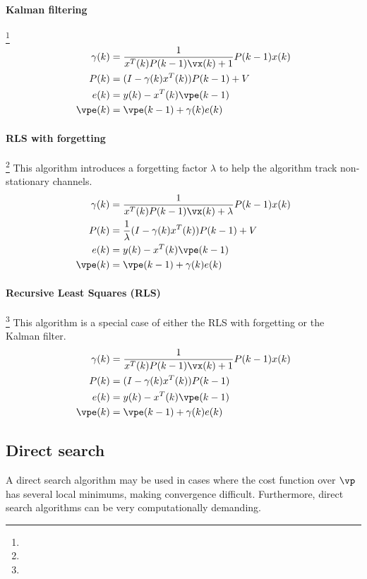 \paragraph{Kalman filtering}\footnote{}
\begin{align*}
   \gamma(k) &= \frac{1}{x^T(k)P(k-1)\vx(k)+1}P(k-1)x(k) \\
   P(k) &= (I-\gamma(k)x^T(k))P(k-1)+V \\
   e(k) &= y(k) - x^T(k)\vpe(k-1) \\
   \vpe(k) &= \vpe(k-1) + \gamma(k)e(k)
\end{align*}

\paragraph{RLS with forgetting}\footnote{}
This algorithm introduces a forgetting factor $\lambda$
to help the algorithm track non-stationary channels.
\begin{align*}
   \gamma(k) &= \frac{1}{x^T(k)P(k-1)\vx(k)+\lambda}  P(k-1)x(k) \\
   P(k) &= \frac{1}{\lambda}(I-\gamma(k)x^T(k))P(k-1)+V \\
   e(k) &= y(k) - x^T(k)\vpe(k-1) \\
   \vpe(k) &= \vpe(k-1) + \gamma(k)e(k)
\end{align*}
\fi

\paragraph{Recursive Least Squares (RLS)}\footnote{}
This algorithm is a special case of either the RLS with forgetting
or the Kalman filter.
\begin{align*}
   \gamma(k) &= \frac{1}{x^T(k)P(k-1)\vx(k)+1}  P(k-1)x(k) \\
   P(k) &= (I-\gamma(k)x^T(k))P(k-1) \\
   e(k) &= y(k) - x^T(k)\vpe(k-1) \\
   \vpe(k) &= \vpe(k-1) + \gamma(k)e(k)
\end{align*}




\subsection{Direct search}
A direct search algorithm may be used in cases where the cost
function over $\vp$ has several local minimums, making convergence difficult.
Furthermore, direct search algorithms can be very computationally demanding.

